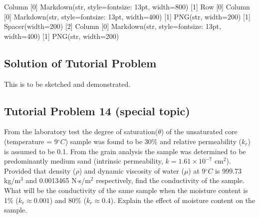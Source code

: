 \documentclass[letterpaper,10pt,english]{sphinxmanual}
\begin{document}
\begin{sphinxVerbatim}[commandchars=\\\{\}]
     

  

    
      
   
\end{sphinxVerbatim}

\begin{sphinxVerbatim}[commandchars=\\\{\}]
Column
    [0] Markdown(str, style=\PYGZob{}\PYGZsq{}font\PYGZhy{}size\PYGZsq{}: \PYGZsq{}13pt\PYGZsq{}\PYGZcb{}, width=800)
    [1] Row
        [0] Column
            [0] Markdown(str, style=\PYGZob{}\PYGZsq{}font\PYGZhy{}size\PYGZsq{}: \PYGZsq{}13pt\PYGZsq{}\PYGZcb{}, width=400)
            [1] PNG(str, width=200)
        [1] Spacer(width=200)
        [2] Column
            [0] Markdown(str, style=\PYGZob{}\PYGZsq{}font\PYGZhy{}size\PYGZsq{}: \PYGZsq{}13pt\PYGZsq{}\PYGZcb{}, width=400)
            [1] PNG(str, width=200)
\end{sphinxVerbatim}


\subsection{Solution of Tutorial Problem}
\label{\detokenize{contents/tutorials/tutorial_05/tutorial_05:solution-of-tutorial-problem}}
This is to be sketched and demonstrated.


\subsection{Tutorial Problem 14 (special topic)}
\label{\detokenize{contents/tutorials/tutorial_05/tutorial_05:tutorial-problem-14-special-topic}}
From the laboratory test the degree of saturation(\(\theta\)) of the unsaturated core (temperature = 9\(^\circ C\)) sample was
found to be 30\% and relative permeability (\(k_r\)) is assumed to be 0.1.  From the grain analysis the sample was determined to be predominantly
medium sand (intrinsic permeability, \(k = 1.61 \times 10^{-7}\) cm\(^2\)). Provided that density (\(\rho\)) and dynamic
viscosity of water (\(\mu\)) at 9\(^\circ C\) is 999.73 kg/m\(^3\) and 0.0013465 N\(\cdot\)s/m\(^2\) respectively, find the conductivity of the
sample. What will be the conductivity of the same sample when the moisture content is 1\% (\(k_r \approx 0.001\)) and 80\% (\(k_r \approx 0.4\)). Explain the effect of moisture content on the sample.
\end{document}
